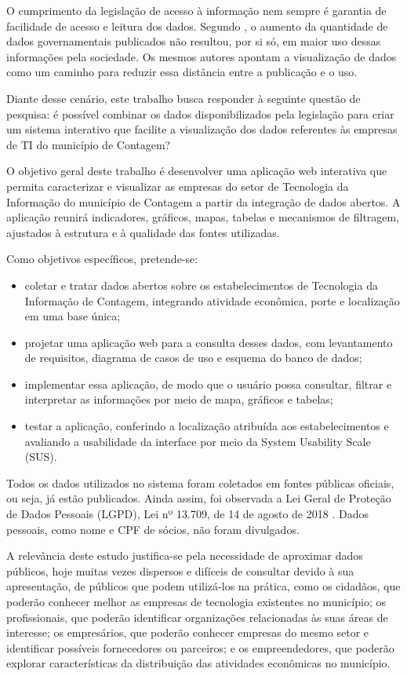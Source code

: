 O cumprimento da legislação de acesso à informação nem sempre é garantia de facilidade de acesso e leitura dos dados.
Segundo , o aumento da quantidade de dados governamentais publicados não resultou, por si só, em maior uso dessas informações pela sociedade.
Os mesmos autores apontam a visualização de dados como um caminho para reduzir essa distância entre a publicação e o uso.

Diante desse cenário, este trabalho busca responder à seguinte questão de pesquisa: é possível combinar os dados disponibilizados pela legislação para criar um sistema interativo que facilite a visualização dos dados referentes às empresas de TI do município de Contagem?

O objetivo geral deste trabalho é desenvolver uma aplicação web interativa que permita caracterizar e visualizar as empresas do setor de Tecnologia da Informação do município de Contagem a partir da integração de dados abertos.
A aplicação reunirá indicadores, gráficos, mapas, tabelas e mecanismos de filtragem, ajustados à estrutura e à qualidade das fontes utilizadas.

Como objetivos específicos, pretende-se:

\begin{itemize}
    \item coletar e tratar dados abertos sobre os estabelecimentos de Tecnologia da Informação de Contagem, integrando atividade econômica, porte e localização em uma base única;
    \item projetar uma aplicação web para a consulta desses dados, com levantamento de requisitos, diagrama de casos de uso e esquema do banco de dados;
    \item implementar essa aplicação, de modo que o usuário possa consultar, filtrar e interpretar as informações por meio de mapa, gráficos e tabelas;
    \item testar a aplicação, conferindo a localização atribuída aos estabelecimentos e avaliando a usabilidade da interface por meio da System Usability Scale (SUS).
\end{itemize}

Todos os dados utilizados no sistema foram coletados em fontes públicas oficiais, ou seja, já estão publicados.
Ainda assim, foi observada a Lei Geral de Proteção de Dados Pessoais (LGPD), Lei nº 13.709, de 14 de agosto de 2018 \cite{brasil2018}.
Dados pessoais, como nome e CPF de sócios, não foram divulgados.

A relevância deste estudo justifica-se pela necessidade de aproximar dados públicos, hoje muitas vezes dispersos e difíceis de consultar devido à sua apresentação, de públicos que podem utilizá-los na prática, como os cidadãos, que poderão conhecer melhor as empresas de tecnologia existentes no município; os profissionais, que poderão identificar organizações relacionadas às suas áreas de interesse; os empresários, que poderão conhecer empresas do mesmo setor e identificar possíveis fornecedores ou parceiros; e os empreendedores, que poderão explorar características da distribuição das atividades econômicas no município.

